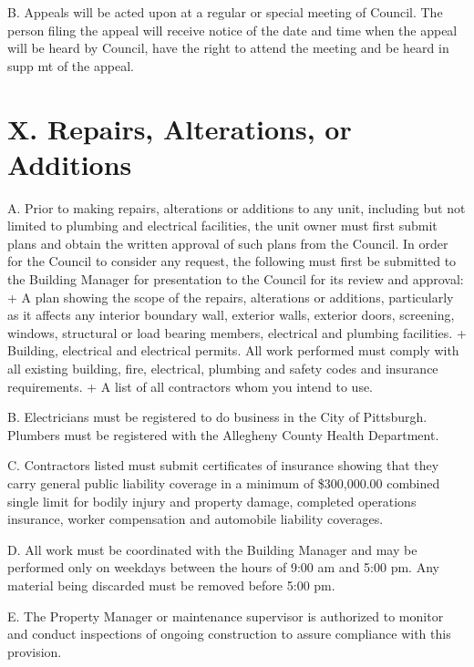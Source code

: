 \documentclass[
]{book}
\begin{document}
B. Appeals will be acted upon at a regular or special meeting of Council. The person filing the appeal will receive notice of the date and time when the appeal will be heard by Council, have the right to attend the meeting and be heard in supp mt of the appeal.

\hypertarget{x.-repairs-alterations-or-additions-2}{%
\section*{X. Repairs, Alterations, or Additions}\label{x.-repairs-alterations-or-additions-2}}

A. Prior to making repairs, alterations or additions to any unit, including but not limited to plumbing and electrical facilities, the unit owner must first submit plans and obtain the written approval of such plans from the Council. In order for the Council to consider any request, the following must first be submitted to the Building Manager for presentation to the Council for its review and approval:
+ A plan showing the scope of the repairs, alterations or additions, particularly as it affects any interior boundary wall, exterior walls, exterior doors, screening, windows, structural or load bearing members, electrical and plumbing facilities.
+ Building, electrical and electrical permits. All work performed must comply with all existing building, fire, electrical, plumbing and safety codes and insurance requirements.
+ A list of all contractors whom you intend to use.

B. Electricians must be registered to do business in the City of Pittsburgh. Plumbers must be registered with the Allegheny County Health Department.

C. Contractors listed must submit certificates of insurance showing that they carry general public liability coverage in a minimum of \$300,000.00 combined single limit for bodily injury and property damage, completed operations insurance, worker compensation and automobile liability coverages.

D. All work must be coordinated with the Building Manager and may be performed only on weekdays between the hours of 9:00 am and 5:00 pm. Any material being discarded must be removed before 5:00 pm.

E. The Property Manager or maintenance supervisor is authorized to monitor and conduct inspections of ongoing construction to assure compliance with this provision.
\end{document}
